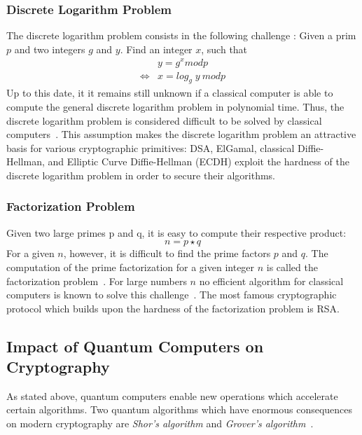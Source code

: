 \subsubsection{Discrete Logarithm Problem} \label{discrete_log_problem}
The discrete logarithm problem consists in the following challenge \parencite{beutelspacher2010diskrete}: Given a prim $p$ and two integers $g$ and $y$. Find an integer $x$, such that
\begin{equation*}
\begin{split}
&y = g^x mod p \\
\iff &x = log_g\;y\:mod p
\end{split}
\end{equation*}
Up to this date, it it remains still unknown if a classical computer is able to compute the general discrete logarithm problem in polynomial time. Thus, the discrete logarithm problem is considered difficult to be solved by classical computers~\parencite{beutelspacher2010diskrete}. This assumption makes the discrete logarithm problem an attractive basis for various cryptographic primitives: \gls{DSA}, ElGamal, classical Diffie-Hellman, and Elliptic Curve Diffie-Hellman (\gls{ECDH}) exploit the hardness of the discrete logarithm problem in order to secure their algorithms.

\subsubsection{Factorization Problem} \label{factorization_problem}

Given two large primes p and q, it is easy to compute their respective product:
\begin{equation*}
n = p \star q
\end{equation*}
For a given $n$, however, it is difficult to find the prime factors $p$ and $q$. The computation of the prime factorization for a given integer $n$ is called the factorization problem~\parencite{ITSicherheit}. For large numbers $n$ no efficient algorithm for classical computers is known to solve this challenge~\parencite{ITSicherheit}. The most famous cryptographic protocol which builds upon the hardness of the factorization problem is \gls{RSA}.

\subsection{Impact of Quantum Computers on Cryptography}

As stated above, quantum computers enable new operations which accelerate certain algorithms. Two quantum algorithms which have enormous consequences on modern cryptography are \textit{Shor's algorithm} and \textit{Grover's algorithm}~\parencite{nielsen2002quantum}.

